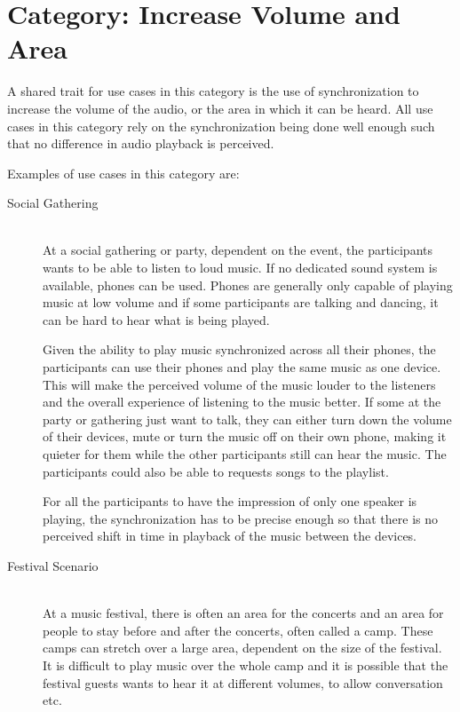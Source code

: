 \section{Category: Increase Volume and Area}\label{sec:category_increase_volume_and_area}
A shared trait for use cases in this category is the use of synchronization to increase the volume of the audio, or the area in which it can be heard.
All use cases in this category rely on the synchronization being done well enough such that no difference in audio playback is perceived.

Examples of use cases in this category are:
\begin{description}
    \item[Social Gathering] \hfill\\
        At a social gathering or party, dependent on the event, the participants wants to be able to listen to loud music.
        If no dedicated sound system is available, phones can be used.
        Phones are generally only capable of playing music at low volume and if some participants are talking and dancing, it can be hard to hear what is being played.

        Given the ability to play music synchronized across all their phones, the participants can use their phones and play the same music as one device.
        This will make the perceived volume of the music louder to the listeners and the overall experience of listening to the music better.
        If some at the party or gathering just want to talk, they can either turn down the volume of their devices, mute or turn the music off on their own phone,
        making it quieter for them while the other participants still can hear the music.
        The participants could also be able to requests songs to the playlist.

        For all the participants to have the impression of only one speaker is playing,
        the synchronization has to be precise enough so that there is no perceived shift in time in playback of the music between the devices.

    \item[Festival Scenario] \hfill\\
        At a music festival, there is often an area for the concerts and an area for people to stay before and after the concerts, often called a camp.
        These camps can stretch over a large area, dependent on the size of the festival.
        It is difficult to play music over the whole camp and it is possible that the festival guests wants to hear it at different volumes, to allow conversation etc.


\end{description}
